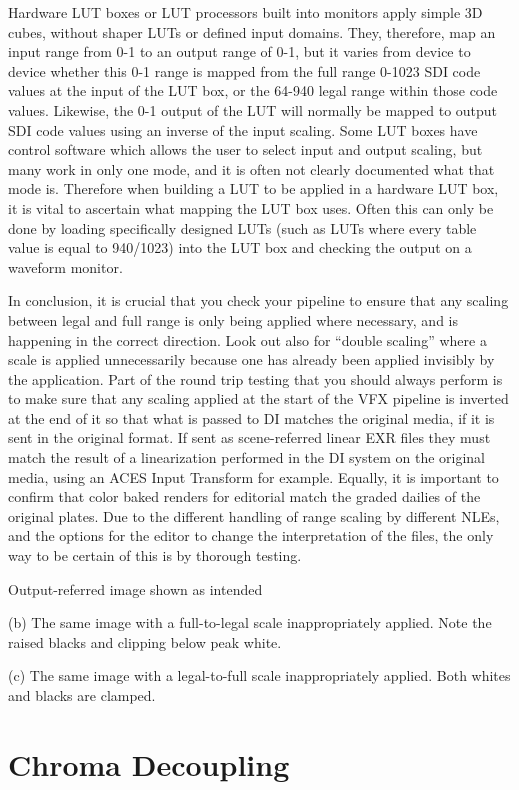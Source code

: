 Hardware LUT boxes or LUT processors built into monitors apply simple 3D cubes, without shaper LUTs or defined input domains. They, therefore, map an input range from 0-1 to an output range of 0-1, but it varies from device to device whether this 0-1 range is mapped from the full range 0-1023 SDI code values at the input of the LUT box, or the 64-940 legal range within those code values. Likewise, the 0-1 output of the LUT will normally be mapped to output SDI code values using an inverse of the input scaling. Some LUT boxes have control software which allows the user to select input and output scaling, but many work in only one mode, and it is often not clearly documented what that mode is. Therefore when building a LUT to be applied in a hardware LUT box, it is vital to ascertain what mapping the LUT box uses. Often this can only be done by loading specifically designed LUTs (such as LUTs where every table value is equal to 940/1023) into the LUT box and checking the output on a waveform monitor.

In conclusion, it is crucial that you check your pipeline to ensure that any scaling between legal and full range is only being applied where necessary, and is happening in the correct direction. Look out also for “double scaling” where a scale is applied unnecessarily because one has already been applied invisibly by the application. Part of the round trip testing that you should always perform is to make sure that any scaling applied at the start of the VFX pipeline is inverted at the end of it so that what is passed to DI matches the original media, if it is sent in the original format. If sent as scene-referred linear EXR files they must match the result of a linearization performed in the DI system on the original media, using an ACES Input Transform for example. Equally, it is important to confirm that color baked renders for editorial match the graded dailies of the original plates. Due to the different handling of range scaling by different NLEs, and the options for the editor to change the interpretation of the files, the only way to be certain of this is by thorough testing.


Output-referred image shown as intended

(b) The same image with a full-to-legal scale inappropriately applied. Note the raised blacks and clipping below peak white.


(c) The same image with a legal-to-full scale inappropriately applied. Both whites and blacks are clamped.

\section{Chroma Decoupling}

